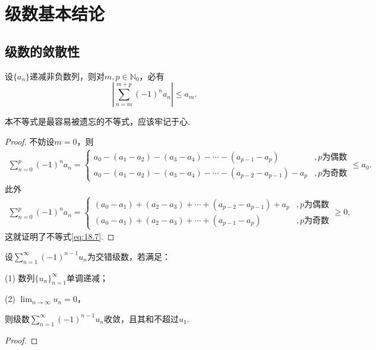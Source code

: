 \documentclass[../../main.tex]{subfiles}%
\begin{document}
\section{级数基本结论}

\subsection{级数的敛散性}

\begin{theorem}[交错级数不等式]\label{theorem:交错级数不等式}
设\(\{a_n\}\)递减非负数列，则对\(m,p\in \mathbb{N}_0\)，必有
\begin{equation}\label{eq:18.7}
\left|\sum_{n = m}^{m + p} (-1)^n a_n\right| \leqslant a_m.
\end{equation}
\end{theorem}
\begin{note}
本不等式是最容易被遗忘的不等式，应该牢记于心.
\end{note}
\begin{proof}

不妨设\(m = 0\)，则
\begin{align*}
\sum_{n = 0}^{p} (-1)^n a_n = 
\begin{cases}
a_0 - (a_1 - a_2) - (a_3 - a_4) - \cdots - (a_{p - 1} - a_p) &, p\text{为偶数} \\
a_0 - (a_1 - a_2) - (a_3 - a_4) - \cdots - (a_{p - 2} - a_{p - 1}) - a_p &, p\text{为奇数}
\end{cases}
\leqslant a_0.
\end{align*}
此外
\begin{align*}
\sum_{n = 0}^{p} (-1)^n a_n = 
\begin{cases}
(a_0 - a_1) + (a_2 - a_3) + \cdots + (a_{p - 2} - a_{p - 1}) + a_p &, p\text{为偶数} \\
(a_0 - a_1) + (a_2 - a_3) + \cdots + (a_{p - 1} - a_p) &, p\text{为奇数}
\end{cases}
\geqslant 0,
\end{align*}
这就证明了不等式\eqref{eq:18.7}.

\end{proof}

\begin{theorem}[Leibniz判别法]\label{theorem:Leibniz(莱布尼兹)判别法}
设$\sum_{n=1}^{\infty} (-1)^{n - 1} u_n$为交错级数，若满足：

(1) 数列$\{u_n\}_{n=1}^{\infty}$单调递减；

(2) $\lim_{n \to \infty} u_n = 0$，

则级数$\sum_{n=1}^{\infty} (-1)^{n - 1} u_n$收敛，且其和不超过$u_1$.
\end{theorem}
\begin{proof}



\end{proof}
\end{document}
